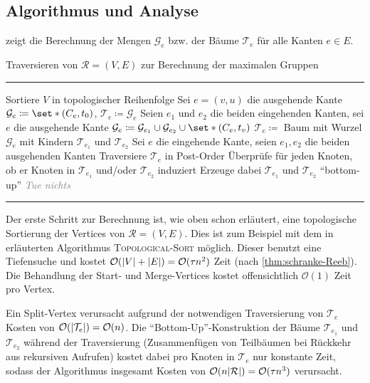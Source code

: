 \subsection{Algorithmus und Analyse} %
\label{sub:algorithmus_und_analyse}
 zeigt die Berechnung der Mengen $\mathcal{G}_e$ bzw. der Bäume $\mathcal{T}_e$ für alle Kanten $e \in E$.
\begin{algorithm}[hbtp]
	\caption{Traversieren von $\mathcal{R}=(V,E)$ zur Berechnung der maximalen Gruppen}\label{alg:max_groups}
	\vspace{.5em}
	\hrule\vspace{.5em}
	
	\begin{algorithmic}
		\State Sortiere $V$ in topologischer Reihenfolge
			\State Sei $e=(v,u)$ die ausgehende Kante
			\State $\mathcal{G}_e \coloneqq \set*{(C_e,t_0)}$, $\mathcal{T}_e \coloneqq \mathcal{G}_e$
			\State Seien $e_1$ und $e_2$ die beiden eingehenden Kanten, sei $e$ die ausgehende Kante
			\State $\mathcal{G}_e \coloneqq \mathcal{G}_{e_1} \cup \mathcal{G}_{e_2} \cup \set*{(C_e,t_v)}$
			\State $\mathcal{T}_e \coloneqq$ Baum mit Wurzel $\mathcal{G}_e$ mit Kindern $\mathcal{T}_{e_1}$ und $\mathcal{T}_{e_2}$
			\State Sei $e$ die eingehende Kante, seien $e_1,e_2$ die beiden ausgehenden Kanten
			\State Traversiere $\mathcal{T}_e$ in Post-Order
			\State Überprüfe für jeden Knoten, ob er Knoten in $\mathcal{T}_{e_1}$ und/oder $\mathcal{T}_{e_2}$ induziert
			\State Erzeuge dabei $\mathcal{T}_{e_1}$ und $\mathcal{T}_{e_2}$ \enquote{bottom-up}
			\State \textcolor{gray}{\emph{Tue nichts}}
			\EndIf
		\EndFor
		\EndProcedure
	\end{algorithmic}
	\hrule
\end{algorithm}

Der erste Schritt zur Berechnung ist, wie oben schon erläutert, eine topologische Sortierung der Vertices von $\mathcal{R}=(V,E)$.
Dies ist zum Beispiel mit dem in \textcite[Sec.~22.4]{cormenIntroduction} erläuterten Algorithmus \textsc{Topological-Sort} möglich.
Dieser benutzt eine Tiefensuche und kostet $\mathcal{O}(\abs*{V} + \abs*{E}) = \mathcal{O}(\tau n^2)$ Zeit (nach \cref{thm:schranke-Reeb}).
Die Behandlung der Start- und Merge-Vertices kostet offensichtlich $\mathcal{O}(1)$ Zeit pro Vertex.

Ein Split-Vertex verursacht aufgrund der notwendigen Traversierung von $\mathcal{T}_e$ Kosten von $\mathcal{O}(\abs*{\mathcal{T}_e}) = \mathcal{O}(n)$.
Die \enquote{Bottom-Up}-Konstruktion der Bäume $\mathcal{T}_{e_1}$ und $\mathcal{T}_{e_2}$ während der Traversierung (Zusammenfügen von Teilbäumen bei Rückkehr aus rekursiven Aufrufen) kostet dabei pro Knoten in $\mathcal{T}_e$ nur konstante Zeit, sodass der Algorithmus insgesamt Kosten von $\mathcal{O}(n \abs*{\mathcal{R}}) = \mathcal{O}(\tau n^3)$ verursacht.

